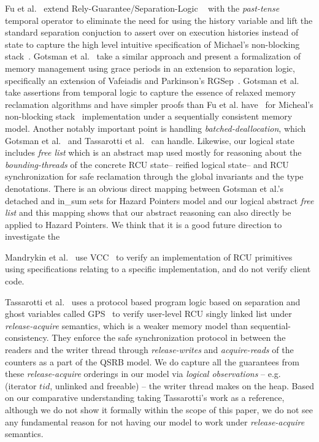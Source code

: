  Fu et al.~\cite{shao_temp} extend Rely-Guarantee/Separation-Logic ~\cite{vafeiadis07,Feng:2007:RCS:1762174.1762193,Feng:2009:LRR:1480881.1480922} with the \textit{past-tense} temporal operator to eliminate the need for using the history variable and lift the standard separation conjuction to assert over on execution histories instead of state to capture the high level intuitive specification of Michael's non-blocking stack~\cite{Michael:2004:HPS:987524.987595}. Gotsman et al.~\cite{Gotsman:2013:VCM:2450268.2450289} take a similar approach and present a formalization of memory management using grace periods in an extension to separation logic, specifically an extension of Vafeiadis and Parkinson's \textsf{RGSep}~\cite{vafeiadis07}. Gotsman et al. take assertions from temporal logic to capture the essence of relaxed memory reclamation algorithms and have simpler proofs than Fu et al. have~\cite{shao_temp} for Micheal's non-blocking stack~\cite{Michael:2004:HPS:987524.987595} implementation under a sequentially consistent memory model. Another notably important point is handling \textit{batched-deallocation}, which Gotsman et al.~\cite{Gotsman:2013:VCM:2450268.2450289} and Tassarotti et al.~\cite{verrcu} can handle. Likewise, our logical state includes \textit{free list} which is an abstract map used mostly for reasoning about the \textit{bounding-threads} of the concrete RCU state-- reified logical state-- and RCU synchronization for safe reclamation through the global invariants and the type denotations. There is an obvious direct mapping between Gotsman et al.'s \textsf{detached} and \textsf{in\_sum} sets for Hazard Pointers model and our logical abstract \textit{free list} and this mapping shows that our abstract reasoning can also directly be applied to Hazard Pointers. We think that it is a good future direction to investigate the 

 Mandrykin et al.~\cite{Mandrykin:2016:TDV:3001219.3001297} use \textsf{VCC}~\cite{Cohen:2009:VPS:1616077.1616080} to verify an implementation of RCU primitives using specifications relating to a specific implementation, and do not verify client code.

 Tassarotti et al.~\cite{verrcu} uses a protocol based program logic based on separation and ghost variables called \textsf{GPS}~\cite{Turon:2014:GNW:2660193.2660243} to verify user-level \textsf{RCU} singly linked list under \emph{release-acquire} semantics, which is a weaker memory model than sequential-consistency. They enforce the safe synchronization protocol in between the readers and the writer thread through \textit{release-writes} and \textit{acquire-reads} of the counters as a part of the QSRB model. We do capture all the guarantees from these \textit{release-acquire} orderings in our model via \textit{logical observations} -- e.g. (\textsf{iterator} $tid$, \textsf{unlinked} and \textsf{freeable}) -- the writer thread makes on the heap. Based on our comparative understanding taking Tassarotti's work as a reference, although we do not show it formally within the scope of this paper, we do not see any fundamental reason for not having our model to work under \textit{release-acquire} semantics.

